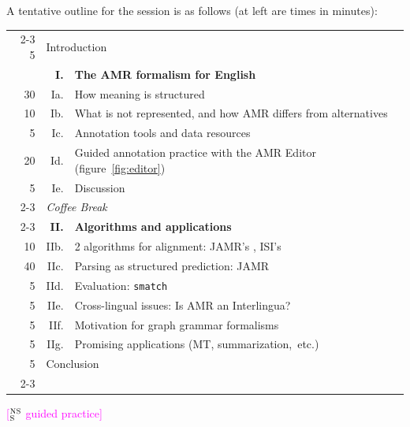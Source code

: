 \documentclass[11pt,letterpaper]{article}
\newcommand{\ensuretext}[1]{#1}
\newcommand{\nssmarker}{\ensuretext{\textcolor{magenta}{\ensuremath{^{\textsc{NS}}_{\textsc{S}}}}}}
\newcommand{\arkcomment}[3]{\ensuretext{\textcolor{#3}{[#1 #2]}}}
\newcommand{\nss}[1]{\arkcomment{\nssmarker}{#1}{magenta}}
\newcommand{\fref}[1]{figure~\ref{#1}}
\begin{document}
A tentative outline for the session is as follows 
(at left are times in minutes):
\begin{center}\small
\hypersetup{citecolor=mdblue}
\noindent\begin{tabular}{@{}r@{~~}|r@{~}p{19em}|@{}}
\cline{2-3}
5 & \multicolumn{2}{l|}{Introduction}\\
  & \textbf{I.} & \textbf{The AMR formalism for English} \citep{amr,amr-guidelines}\\
30 & Ia. & How meaning is structured\\
10 & Ib. & What is not represented, and how AMR differs from alternatives\\
 5 & Ic. & Annotation tools and data resources\\
20 & Id. & Guided annotation practice with the AMR Editor (\fref{fig:editor})\\
 5 & Ie. & Discussion\\
\cline{2-3}
\multicolumn{1}{@{}r}{15} & \multicolumn{2}{l}{\textit{Coffee Break}}\\
\cline{2-3}
  & \textbf{II.} & \textbf{Algorithms and applications}\\
10 & IIb. & 2 algorithms for alignment: JAMR's \citep{flanigan-14}, ISI's \citep{pourdamghani-14} \\
40 & IIc. & Parsing as structured prediction: JAMR \citep{flanigan-14} \\
 5 & IId. & Evaluation: \texttt{smatch} \citep{cai-13} \\
 5 & IIe. & Cross-lingual issues: Is AMR an Interlingua? \citep{xue-14} \\
 5 & IIf. & Motivation for graph grammar formalisms \citep{braune-14} \\
 5 & IIg. & Promising applications (MT, summarization,~etc.) \\
 5 & \multicolumn{2}{l|}{Conclusion}\\
\cline{2-3}
\end{tabular}
\end{center}

\nss{guided practice}
\end{document}
